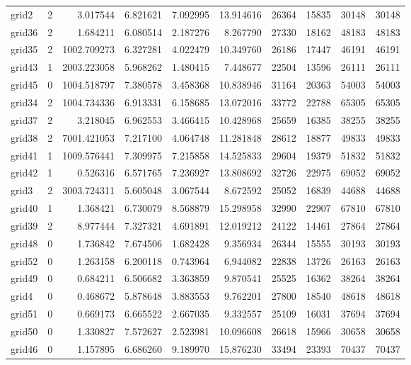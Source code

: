\begin{longtable}{|l|r|r|r|r|r|r|r|r|r|}
grid2 & 2 & 3.017544 & 6.821621 & 7.092995 & 13.914616 & 26364 & 15835 & 30148 & 30148 \\
grid36 & 2 & 1.684211 & 6.080514 & 2.187276 & 8.267790 & 27330 & 18162 & 48183 & 48183 \\
grid35 & 2 & 1002.709273 & 6.327281 & 4.022479 & 10.349760 & 26186 & 17447 & 46191 & 46191 \\
grid43 & 1 & 2003.223058 & 5.968262 & 1.480415 & 7.448677 & 22504 & 13596 & 26111 & 26111 \\
grid45 & 0 & 1004.518797 & 7.380578 & 3.458368 & 10.838946 & 31164 & 20363 & 54003 & 54003 \\
grid34 & 2 & 1004.734336 & 6.913331 & 6.158685 & 13.072016 & 33772 & 22788 & 65305 & 65305 \\
grid37 & 2 & 3.218045 & 6.962553 & 3.466415 & 10.428968 & 25659 & 16385 & 38255 & 38255 \\
grid38 & 2 & 7001.421053 & 7.217100 & 4.064748 & 11.281848 & 28612 & 18877 & 49833 & 49833 \\
grid41 & 1 & 1009.576441 & 7.309975 & 7.215858 & 14.525833 & 29604 & 19379 & 51832 & 51832 \\
grid42 & 1 & 0.526316 & 6.571765 & 7.236927 & 13.808692 & 32726 & 22975 & 69052 & 69052 \\
grid3 & 2 & 3003.724311 & 5.605048 & 3.067544 & 8.672592 & 25052 & 16839 & 44688 & 44688 \\
grid40 & 1 & 1.368421 & 6.730079 & 8.568879 & 15.298958 & 32990 & 22907 & 67810 & 67810 \\
grid39 & 2 & 8.977444 & 7.327321 & 4.691891 & 12.019212 & 24122 & 14461 & 27864 & 27864 \\
grid48 & 0 & 1.736842 & 7.674506 & 1.682428 & 9.356934 & 26344 & 15555 & 30193 & 30193 \\
grid52 & 0 & 1.263158 & 6.200118 & 0.743964 & 6.944082 & 22838 & 13726 & 26163 & 26163 \\
grid49 & 0 & 0.684211 & 6.506682 & 3.363859 & 9.870541 & 25525 & 16362 & 38264 & 38264 \\
grid4 & 0 & 0.468672 & 5.878648 & 3.883553 & 9.762201 & 27800 & 18540 & 48618 & 48618 \\
grid51 & 0 & 0.669173 & 6.665522 & 2.667035 & 9.332557 & 25109 & 16031 & 37694 & 37694 \\
grid50 & 0 & 1.330827 & 7.572627 & 2.523981 & 10.096608 & 26618 & 15966 & 30658 & 30658 \\
grid46 & 0 & 1.157895 & 6.686260 & 9.189970 & 15.876230 & 33494 & 23393 & 70437 & 70437 \\

\end{longtable}
